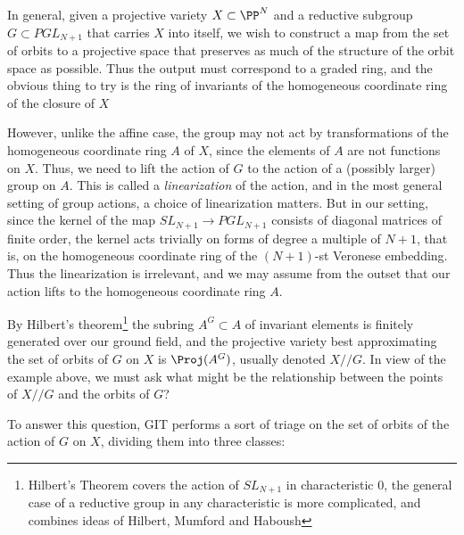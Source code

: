In general, given a projective variety $X \subset \PP^N$ and a reductive subgroup $G \subset PGL_{N+1}$ that carries $X$ into itself, we wish to construct a map from the set of orbits
to a projective space that preserves as much of the structure of the orbit space as possible. Thus
the output must correspond to a graded ring, and the obvious thing to try is the ring of invariants
of the homogeneous coordinate ring of the closure of $X$

However, unlike the affine case, the group may not act by transformations of the homogeneous coordinate ring $A$ of $X$, since the elements of $A$ are not functions on $X$. Thus, we need to lift the action of 
$G$ to the action of a (possibly larger) group on $A$.  This is called a \emph{linearization} of the action, and in the most general setting of group actions,
a choice of linearization matters.  But in our setting, since the kernel of the map $SL_{N+1} \to PGL_{N+1}$ consists of diagonal matrices of finite order, the kernel acts trivially on forms of degree a multiple
of $N+1$, that is, on the homogeneous coordinate ring of the $(N+1)$-st Veronese embedding. Thus the linearization is irrelevant, and we may assume from the outset that our action lifts to the homogeneous coordinate ring $A$.

By Hilbert's theorem\footnote{Hilbert's Theorem covers the action of $SL_{N+1}$ in characteristic 0, the general case of a reductive group in any characteristic is more complicated, and combines ideas of 
Hilbert, Mumford and Haboush} the subring $A^G \subset A$ of invariant elements is finitely generated over our ground field, and the projective variety best approximating the set of orbits of $G$ on $X$ 
is $\Proj(A^G)$, usually denoted $X//G$. In view of the example above, we must ask what might be
the relationship between the points of $X//G$ and the orbits of $G$? 

To answer this question, GIT performs a sort of triage on the set of orbits of the action of $G$ on $X$, dividing them into three classes:

